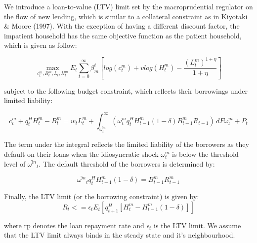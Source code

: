 \documentclass[12pt]{article}
\numberwithin{equation}{section}
\begin{document}
We introduce a loan-to-value (LTV) limit set by the macroprudential regulator on the flow of new lending, which is similar to a collateral constraint as in Kiyotaki \& Moore (1997). With the exception of having a different discount factor, the impatient household has the same objective function as the patient household, which is given as follow: 

\begin{equation}
\max_{c^m_t,B^m_t,L_{t},H^m_t}E_t\sum _{t=0}^{\infty } \beta^t_{m} [log(c^m_t)+vlog(H^m_t)-\frac{(L^m_t)^{1+\eta}}{1+\eta} ]
\end{equation}

subject to the following budget constraint, which reflects their borrowings under limited liability: 

\begin{equation}
c^m_t+q^H_{t}H^m_{t} -B^m_{t}=w_{t}L^m_{t}+\int_{\bar{\omega^m_{t} }}^\infty  \left(\omega^m_{t} q^H_{t} H^m_{t-1} (1-\delta)B^m_{t-1}R_{t-1}\right) \, dF\omega^m_{t} + P_{t}
\end{equation}

The term under the integral reflects the limited liability of the borrowers as they default on their loans when the idiosyncratic shock $\omega^m_{t}$ is below the threshold level of $\bar{\omega^m}_t$. The default threshold of the borrowers is determined by: 

\begin{equation}
\bar{\omega^m}_t q^H_{t} H^m_{t-1}(1-\delta) = B^m_{t-1}R^m_{t-1}
\end{equation}


Finally, the LTV limit (or the borrowing constraint) is given by:
\begin{equation}
[B^m_{t}-(1-rp)B^m_{t-1}]R_{t} <=\epsilon_{t} E_t[q^H_{t+1} [H^m_t-H^m_{t-1}(1-\delta)]]
\end{equation}

where rp denotes the loan repayment rate and $\epsilon_{t}$ is the LTV limit. We assume that the LTV limit always binds in the steady state and it's neighbourhood.
\end{document}

